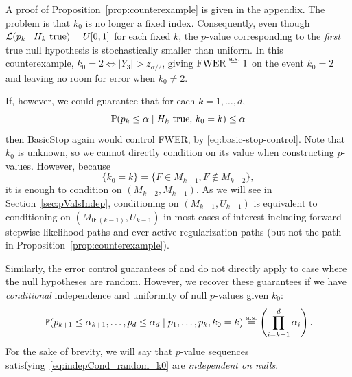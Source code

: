 \documentclass{article}
\begin{document}
A proof of Proposition~\ref{prop:counterexample} is given in the appendix.  The problem is that $k_0$ is no longer a fixed index. Consequently, even though $\L(p_k \mid H_k \text{ true})=U[0,1]$ for each fixed $k$, the $p$-value  corresponding to the {\em first} true null hypothesis is stochastically smaller than uniform. In this counterexample, $k_0=2 \iff |Y_3|>z_{\alpha/2}$, giving $\text{FWER}\eqAS 1$ on the event $k_0=2$ and leaving no room for error when $k_0\neq 2$.

If, however, we could guarantee that for each $k=1,\ldots, d$,
\[
\P(p_k \leq \alpha \mid H_k \text{ true},\, k_0=k) \leq \alpha
\]
then BasicStop again would control FWER, by \eqref{eq:basic-stop-control}. Note that $k_0$ is unknown, so we cannot directly condition on its value when constructing $p$-values. However, because
\[
\{k_0=k\} = \{F\in M_{k-1}, F\notin M_{k-2}\},
\]
it is enough to condition on $(M_{k-2}, M_{k-1})$. As we will see in Section~\ref{sec:pValsIndep}, conditioning on $(M_{k-1}, U_{k-1})$ is equivalent to conditioning on $(M_{0:(k-1)}, U_{k-1})$ in most cases of interest including forward stepwise likelihood paths and ever-active regularization paths (but not the path in Proposition~\ref{prop:counterexample}).

Similarly, the error control guarantees of \citet{gsell2013sequential} and \citet{li2015accumulation} do not directly apply to case where the null hypotheses are random. However, we recover these guarantees if we have {\em conditional} independence and uniformity of null $p$-values given $k_0$:
\begin{equation}\label{eq:indepCond_random_k0}
  \P(p_{k+1} \leq \alpha_{k+1}, \ldots, p_d \leq \alpha_d
  \mid p_1, \ldots, p_k, k_0 = k ) \eqAS \left(\prod_{i=k+1}^d \alpha_i\right) .
\end{equation}
For the sake of brevity, we will say that $p$-value sequences satisfying~\eqref{eq:indepCond_random_k0} are {\em independent on nulls}.
\end{document}
